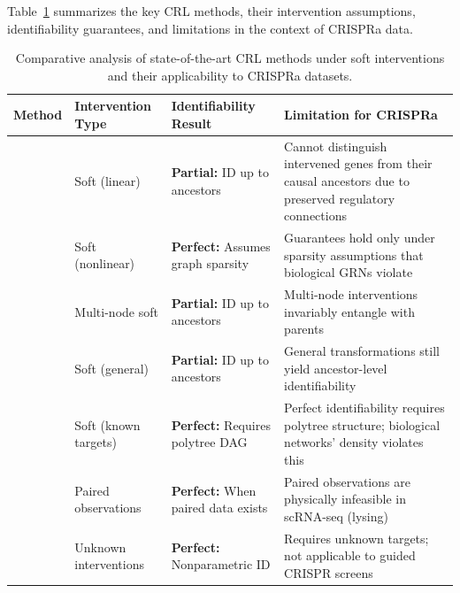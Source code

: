 Table~\ref{tab:crl_methods_comparison} summarizes the key CRL methods, their intervention assumptions, identifiability guarantees, and limitations in the context of CRISPRa data.

\begin{table}[htbp]
    \centering
    \caption{Comparative analysis of state-of-the-art CRL methods under soft interventions and their applicability to CRISPRa datasets.}
    \label{tab:crl_methods_comparison}
    \small
    \renewcommand{\arraystretch}{1.4}
    \begin{tabularx}{\textwidth}{@{} l >{\raggedright\arraybackslash}p{3cm} X X @{}}
        \toprule
        \textbf{Method} & \textbf{Intervention Type} & \textbf{Identifiability Result} & \textbf{Limitation for CRISPRa} \\
        \midrule
        \citet{squires2023linear} & Soft (linear) & \textbf{Partial:} ID up to ancestors & Cannot distinguish intervened genes from their causal ancestors due to preserved regulatory connections \\
        \addlinespace
        \citet{buchholz2023learning} & Soft (nonlinear) & \textbf{Perfect:} Assumes graph sparsity & Guarantees hold only under sparsity assumptions that biological GRNs violate \\
        \addlinespace
        \citet{varici2024multi} & Multi-node soft & \textbf{Partial:} ID up to ancestors & Multi-node interventions invariably entangle with parents \\
        \addlinespace
        \citet{varici2025score} & Soft (general) & \textbf{Partial:} ID up to ancestors & General transformations still yield ancestor-level identifiability \\
        \addlinespace
        \citet{zhang2023identifiability} & Soft (known targets) & \textbf{Perfect:} Requires polytree DAG & Perfect identifiability requires polytree structure; biological networks' density violates this \\
        \addlinespace
        \citet{brehmer2022weakly} & Paired observations & \textbf{Perfect:} When paired data exists & Paired observations are physically infeasible in scRNA-seq (lysing) \\
        \addlinespace
        \citet{von2023nonparametric} & Unknown interventions & \textbf{Perfect:} Nonparametric ID & Requires unknown targets; not applicable to guided CRISPR screens \\
        \bottomrule
    \end{tabularx}
\end{table}

